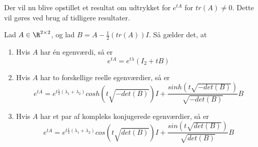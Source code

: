 Der vil nu blive opstillet et resultat om udtrykket for $e^{tA}$ for $tr(A) \neq 0$. Dette vil gøres ved brug af tidligere resultater.

\begin{thmx} \textbf{} %
\newline
Lad $A\in \R^{2\times 2}$, og lad $B = A - \frac{1}{2}(tr(A))I$. Så gælder det, at
\begin{enumerate}
    \item Hvis $A$ har én egenværdi, så er $$e^{tA}=e^{t\lambda}(I_2+tB)$$
    \item Hvis $A$ har to forskellige reelle egenværdier, så er $$e^{tA}=e^{t\frac{1}{2}(\lambda_1+\lambda_2)}cosh\left(t\sqrt{-det(B)}\right)I+\frac{sinh\left(t\sqrt{-det(B)}\right)}{\sqrt{-det(B)}}B$$
    \item Hvis $A$ har et par af kompleks konjugerede egenværdier, så er $$e^{tA}=e^{t\frac{1}{2}(\lambda_1+\lambda_2)}cos\left(t\sqrt{det(B)}\right)I+\frac{sin\left(t\sqrt{det(B)}\right)}{\sqrt{det(B)}}B$$
\end{enumerate}
\end{thmx}

